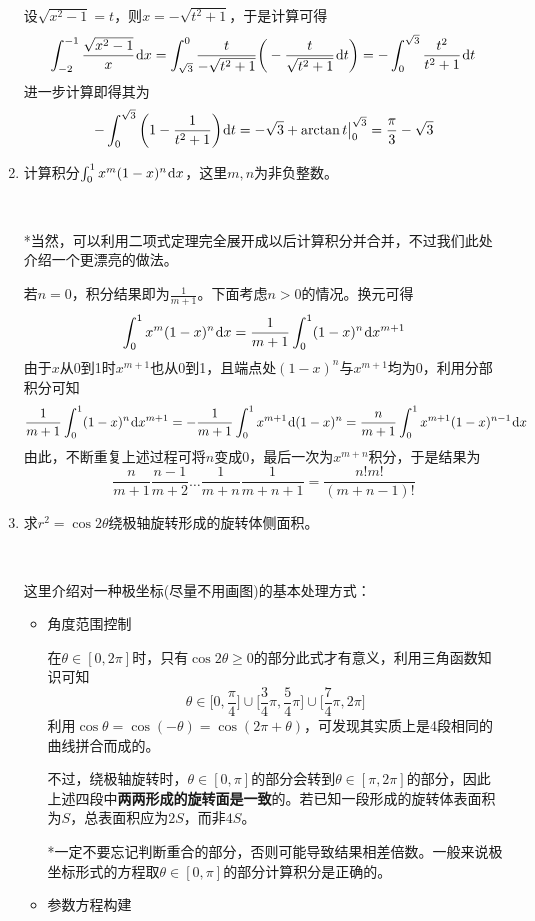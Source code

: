 \documentclass[a4paper,UTF8,fontset=windows]{ctexart}
\newcommand*{\dr}{\hspace{0.07em}\mathrm{d}}
\begin{document}
\begin{enumerate}
    设$\sqrt{x^2-1}=t$，则$x=-\sqrt{t^2+1}$，于是计算可得
    $$\int_{-2}^{-1}\frac{\sqrt{x^2-1}}{x}\dr x=\int_{\sqrt3}^0\frac{t}{-\sqrt{t^2+1}}\bigg(-\frac{t}{\sqrt{t^2+1}}\dr t\bigg)=-\int_0^{\sqrt3}\frac{t^2}{t^2+1}\dr t$$
    进一步计算即得其为
    $$-\int_0^{\sqrt3}\bigg(1-\frac{1}{t^2+1}\bigg)\dr t=-\sqrt{3}+\arctan t\big|^{\sqrt3}_0=\frac{\pi}{3}-\sqrt3$$

    \item 计算积分$\int_0^1x^m(1-x)^n\dr x$，这里$m,n$为非负整数。
    
    \

    *当然，可以利用二项式定理完全展开成以后计算积分并合并，不过我们此处介绍一个更漂亮的做法。

    若$n=0$，积分结果即为$\frac{1}{m+1}$。下面考虑$n>0$的情况。换元可得
    $$\int_0^1x^m(1-x)^n\dr x=\frac{1}{m+1}\int_0^1(1-x)^n\dr x^{m+1}$$
    由于$x$从0到1时$x^{m+1}$也从0到1，且端点处$(1-x)^n$与$x^{m+1}$均为0，利用分部积分可知
    $$\frac{1}{m+1}\int_0^1(1-x)^n\dr x^{m+1}=-\frac{1}{m+1}\int_0^1x^{m+1}\dr(1-x)^n=\frac{n}{m+1}\int_0^1x^{m+1}(1-x)^{n-1}\dr x$$
    由此，不断重复上述过程可将$n$变成0，最后一次为$x^{m+n}$积分，于是结果为
    $$\frac{n}{m+1}\frac{n-1}{m+2}\dots\frac{1}{m+n}\frac{1}{m+n+1}=\frac{n!m!}{(m+n-1)!}$$
    
    \item 求$r^2=\cos2\theta$绕极轴旋转形成的旋转体侧面积。
    
    \

    这里介绍对一种极坐标(尽量不用画图)的基本处理方式：
    \begin{itemize}
        \item 角度范围控制
        
        在$\theta\in[0,2\pi]$时，只有$\cos2\theta\ge0$的部分此式才有意义，利用三角函数知识可知
        $$\theta\in\big[0,\frac{\pi}{4}\big]\cup\big[\frac{3}{4}\pi,\frac{5}{4}\pi]\cup\big[\frac{7}{4}\pi,2\pi]$$
        利用$\cos\theta=\cos(-\theta)=\cos(2\pi+\theta)$，可发现其实质上是4段相同的曲线拼合而成的。

        不过，绕极轴旋转时，$\theta\in[0,\pi]$的部分会转到$\theta\in[\pi,2\pi]$的部分，因此上述四段中\textbf{两两形成的旋转面是一致}的。若已知一段形成的旋转体表面积为$S$，总表面积应为$2S$，而非$4S$。

        *一定不要忘记判断重合的部分，否则可能导致结果相差倍数。一般来说极坐标形式的方程取$\theta\in[0,\pi]$的部分计算积分是正确的。

        \item 参数方程构建
        

\end{itemize}
\end{enumerate}
\end{document}
